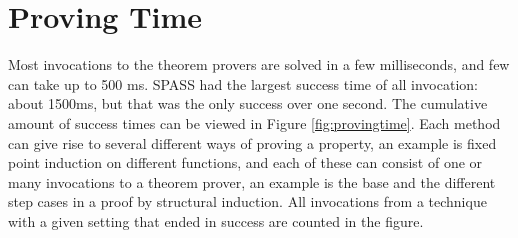 \begin{comment}
\begin{table}[h]

\caption{Number of proved properties per file and proof method, using
  all provers. An empty cell means nothing proved.
\label{tbl:allstats}
}
\end{table}

\paragraph{Discussion}

These results shreds some light over the success of approximation
lemma: it is applicable for non recursive structures. That enables it
to prove properties from \ts{Bool} and \ts{MonadMaybe}, as well as on
the tuple result in \ts{MonadState}. On the other hand, fixed point
induction is only for recursive functions. It performs well on the
tests suited for it, notably the Infinite file, but also surprisingly
on the Theorems from \ts{ProductiveUseOfFailure} which are only
contains properties about lists and natural numbers.

The two files \ts{Nat} and \ts{ZenoLists} are taken from the Zeno test
suite \citep{zeno}. Zeno accomplishes to prove all but two properties,
and the situation is a bit different here. If the theorems and finite
theorems are summed, the result is 26/33 for \ts{Nat} and 36/54 for
\ts{ZenoLists}. The explanation is simple, our tool neither use nor
discover lemmas, whereas Zeno can. A similar result can be found in
the test suite file \ts{ProductiveUseOfFailure} from the paper with
the same name \citep{productiveuse}. The tests from that paper
includes the lemmas discovered by their tool, and most of the theorems
we can prove are those lemmas. Lemmas are crucial in many files,
examples are \ts{InsertionSort} and \ts{Reverse}. It is also needed to
prove more sophisticated properties not widely included in this test
suite.

\end{comment}


\section{Proving Time}

Most invocations to the theorem provers are solved in a few
milliseconds, and few can take up to 500 ms. SPASS had the largest
success time of all invocation: about 1500ms, but that was the only
success over one second. The cumulative amount of success times can be
viewed in Figure \ref{fig:provingtime}. Each method can give rise to
several different ways of proving a property, an example is fixed
point induction on different functions, and each of these can consist
of one or many invocations to a theorem prover, an example is the base
and the different step cases in a proof by structural induction.  All
invocations from a technique with a given setting that ended in
success are counted in the figure.


